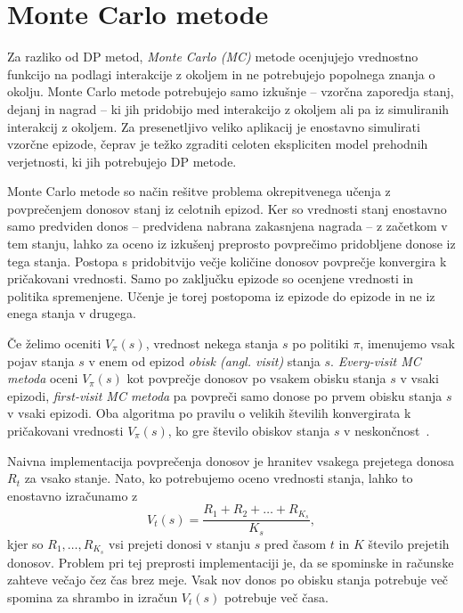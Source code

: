 \documentclass[a4paper, oneside, 12pt]{report}
\begin{document}
\section{Monte Carlo metode}
Za razliko od DP metod, {\em Monte Carlo (MC)} metode ocenjujejo vrednostno funkcijo na podlagi interakcije z okoljem in ne potrebujejo popolnega znanja o okolju. Monte Carlo metode potrebujejo samo izkušnje -- vzorčna zaporedja stanj, dejanj in nagrad -- ki jih pridobijo med interakcijo z okoljem ali pa iz  simuliranih interakcij z okoljem. Za presenetljivo veliko aplikacij je enostavno simulirati vzorčne epizode, čeprav je težko zgraditi celoten ekspliciten model prehodnih verjetnosti, ki jih potrebujejo DP metode.

Monte Carlo metode so način rešitve problema okrepitvenega učenja z povprečenjem donosov stanj iz celotnih epizod. Ker so vrednosti stanj enostavno samo predviden donos -- predvidena nabrana zakasnjena nagrada -- z začetkom v tem stanju, lahko za oceno iz izkušenj preprosto povprečimo pridobljene donose iz tega stanja. Postopa s pridobitvijo večje količine donosov povprečje konvergira k pričakovani vrednosti. Samo po zaključku epizode so ocenjene vrednosti in politika spremenjene. Učenje je torej postopoma iz epizode do epizode in ne iz enega stanja v drugega.

Če želimo oceniti $V_\pi(s)$, vrednost nekega stanja $s$ po politiki $\pi$, imenujemo vsak pojav stanja $s$ v enem od epizod {\em obisk (angl. visit)} stanja $s$. {\em Every-visit MC metoda} oceni $V_\pi(s)$ kot povprečje donosov po vsakem obisku stanja $s$ v vsaki epizodi, {\em first-visit MC metoda} pa povpreči samo donose po prvem obisku stanja $s$ v vsaki epizodi. Oba algoritma po pravilu o velikih številih konvergirata k pričakovani vrednosti $V_\pi(s)$, ko gre število obiskov stanja $s$ v neskončnost~\cite{ReinforcementLearningWithReplacingEligibilityTraces}.


Naivna implementacija povprečenja donosov je hranitev vsakega prejetega donosa $R_t$ za vsako stanje. Nato, ko potrebujemo oceno vrednosti stanja, lahko to enostavno izračunamo z
\begin{equation}
V_t(s) = \frac{R_1 + R_2 + \dots + R_{K_s}}{K_s},
\end{equation}
kjer so $R_1, \dots, R_{K_s}$ vsi prejeti donosi v stanju $s$ pred časom $t$ in $K$ število prejetih donosov. Problem pri tej preprosti implementaciji je, da se spominske in računske zahteve večajo čez čas brez meje. Vsak nov donos po obisku stanja potrebuje več spomina za shrambo in izračun $V_t(s)$ potrebuje več časa.
\end{document}
